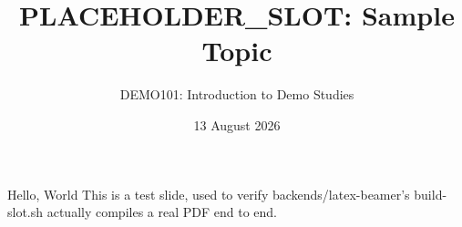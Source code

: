 \title{PLACEHOLDER_SLOT: Sample Topic}
\author{DEMO101: Introduction to Demo Studies}
\date{13 August 2026}



\begin{frame}
\titlepage
\end{frame}

\begin{frame}{Hello, World}
This is a test slide, used to verify backends/latex-beamer's build-slot.sh
actually compiles a real PDF end to end.
\end{frame}


